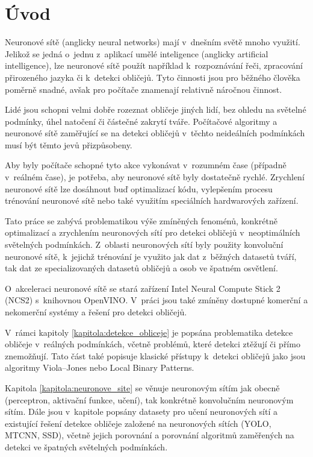 \chapter{Úvod}
\label{kapitola:uvod}
Neuronové sítě (anglicky neural networks) mají v~dnešním světě mnoho využití. Jelikož se jedná o~jednu z~aplikací umělé inteligence (anglicky artificial intelligence), lze neuronové sítě použít například k~rozpoznávání řeči, zpracování přirozeného jazyka či k~detekci obličejů.
Tyto činnosti jsou pro běžného člověka poměrně snadné, avšak pro počítače znamenají relativně náročnou činnost.

Lidé jsou schopni velmi dobře rozeznat obličeje jiných lidí, bez ohledu na světelné podmínky, úhel natočení či částečné zakrytí tváře. Počítačové algoritmy a neuronové sítě zaměřující se na detekci obličejů v~těchto neideálních podmínkách musí být těmto jevů přizpůsobeny.

Aby byly počítače schopné tyto akce vykonávat v~rozumném čase (případně v~reálném čase), je potřeba, aby neuronové sítě byly dostatečně rychlé. Zrychlení neuronové sítě lze dosáhnout buď optimalizací kódu, vylepšením procesu trénování neuronové sítě nebo také využitím speciálních hardwarových zařízení. 

Tato práce se zabývá problematikou výše zmíněných fenoménů, konkrétně optimalizací a zrychlením neuronových sítí pro detekci obličejů v~neoptimálních světelných podmínkách. Z~oblasti neuronových sítí byly použity konvoluční neuronové sítě, k~jejichž trénování je využito jak dat z~běžných datasetů tváří, tak dat ze specializovaných datasetů obličejů a osob ve špatném osvětlení. 

O~akceleraci neuronové sítě se stará zařízení Intel Neural Compute Stick 2 (NCS2) s~knihovnou OpenVINO. V~práci jsou také zmíněny dostupné komerční a nekomerční systémy a řešení pro detekci obličejů.

V~rámci kapitoly \ref{kapitola:detekce_obliceje} je popsána problematika detekce obličeje v~reálných podmínkách, včetně problémů, které detekci ztěžují či přímo znemožňují. Tato část také popisuje klasické přístupy k~detekci obličejů jako jsou algoritmy Viola--Jones nebo Local Binary Patterns.

Kapitola \ref{kapitola:neuronove_site} se věnuje neuronovým sítím jak obecně (perceptron, aktivační funkce, učení), tak konkrétně konvolučním neuronovým sítím. Dále jsou v~kapitole popsány datasety pro učení neuronových sítí a existující řešení detekce obličeje založené na neuronových sítích (YOLO, MTCNN, SSD), včetně jejich porovnání a porovnání algoritmů zaměřených na detekci ve špatných světelných podmínkách.

